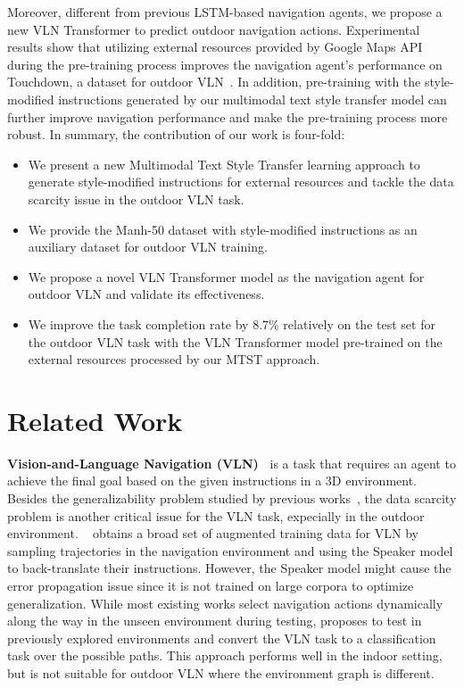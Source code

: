 \documentclass[11pt,a4paper]{article}
\begin{document}
Moreover, different from previous LSTM-based navigation agents, we propose a new VLN Transformer to predict outdoor navigation actions.
Experimental results show that utilizing external resources provided by Google Maps API during the pre-training process improves the navigation agent's performance on Touchdown, a dataset for outdoor VLN~\cite{chen2019touchdown}.
In addition, pre-training with the style-modified instructions generated by our multimodal text style transfer model can further improve navigation performance and make the pre-training process more robust. In summary, the contribution of our work is four-fold:
\begin{itemize}
    \item We present a new Multimodal Text Style Transfer learning approach to generate style-modified instructions for external resources and tackle the data scarcity issue in the outdoor VLN task. \item We provide the Manh-50 dataset with style-modified instructions as an auxiliary dataset for outdoor VLN training. \item We propose a novel VLN Transformer model as the navigation agent for outdoor VLN and validate its effectiveness.  \item We improve the task completion rate by 8.7\% relatively on the test set for the outdoor VLN task with the VLN Transformer model pre-trained on the external resources processed by our MTST approach. \end{itemize}

\section{Related Work}
\noindent\textbf{Vision-and-Language Navigation (VLN)~} is a task that requires an agent to achieve the final goal based on the given instructions in a 3D environment. 
Besides the generalizability problem studied by previous works~\cite{Wang-2018,wang2019reinforced,tan2019learning,zhang2020diagnosing}, the data scarcity problem is another critical issue for the VLN task, expecially in the outdoor environment\cite{chen2019touchdown,mehta2020retouchdown,DBLP:conf/emnlp/Xiang0W20}. ~\citet{fried2018speakerfollower} obtains a broad set of augmented training data for VLN by sampling trajectories in the navigation environment and using the Speaker model to back-translate their instructions. However, the Speaker model might cause the error propagation issue since it is not trained on large corpora to optimize generalization.
While most existing works select navigation actions dynamically along the way in the unseen environment during testing, \citet{majumdar2020improving} proposes to test in previously explored environments and convert the VLN task to a classification task over the possible paths. This approach performs well in the indoor setting, but is not suitable for outdoor VLN where the environment graph is different.
\end{document}
